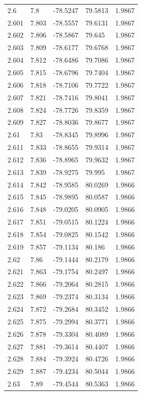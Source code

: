 \begin{tabular}{lllll}
2.6 & 7.8 & -78.5247 & 79.5813 & 1.9867 \\
2.601 & 7.803 & -78.5557 & 79.6131 & 1.9867 \\
2.602 & 7.806 & -78.5867 & 79.645 & 1.9867 \\
2.603 & 7.809 & -78.6177 & 79.6768 & 1.9867 \\
2.604 & 7.812 & -78.6486 & 79.7086 & 1.9867 \\
2.605 & 7.815 & -78.6796 & 79.7404 & 1.9867 \\
2.606 & 7.818 & -78.7106 & 79.7722 & 1.9867 \\
2.607 & 7.821 & -78.7416 & 79.8041 & 1.9867 \\
2.608 & 7.824 & -78.7726 & 79.8359 & 1.9867 \\
2.609 & 7.827 & -78.8036 & 79.8677 & 1.9867 \\
2.61 & 7.83 & -78.8345 & 79.8996 & 1.9867 \\
2.611 & 7.833 & -78.8655 & 79.9314 & 1.9867 \\
2.612 & 7.836 & -78.8965 & 79.9632 & 1.9867 \\
2.613 & 7.839 & -78.9275 & 79.995 & 1.9867 \\
2.614 & 7.842 & -78.9585 & 80.0269 & 1.9866 \\
2.615 & 7.845 & -78.9895 & 80.0587 & 1.9866 \\
2.616 & 7.848 & -79.0205 & 80.0905 & 1.9866 \\
2.617 & 7.851 & -79.0515 & 80.1224 & 1.9866 \\
2.618 & 7.854 & -79.0825 & 80.1542 & 1.9866 \\
2.619 & 7.857 & -79.1134 & 80.186 & 1.9866 \\
2.62 & 7.86 & -79.1444 & 80.2179 & 1.9866 \\
2.621 & 7.863 & -79.1754 & 80.2497 & 1.9866 \\
2.622 & 7.866 & -79.2064 & 80.2815 & 1.9866 \\
2.623 & 7.869 & -79.2374 & 80.3134 & 1.9866 \\
2.624 & 7.872 & -79.2684 & 80.3452 & 1.9866 \\
2.625 & 7.875 & -79.2994 & 80.3771 & 1.9866 \\
2.626 & 7.878 & -79.3304 & 80.4089 & 1.9866 \\
2.627 & 7.881 & -79.3614 & 80.4407 & 1.9866 \\
2.628 & 7.884 & -79.3924 & 80.4726 & 1.9866 \\
2.629 & 7.887 & -79.4234 & 80.5044 & 1.9866 \\
2.63 & 7.89 & -79.4544 & 80.5363 & 1.9866 \\

\end{tabular}
